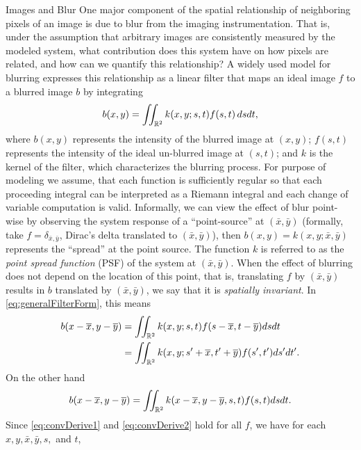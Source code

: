 \begin{chapter}{Images and Blur}
  One major component of the spatial relationship of neighboring pixels of an image is due to blur from the imaging instrumentation.
  That is, under the assumption that arbitrary images are consistently measured by the modeled system, what contribution does this system have on how pixels are related, and how can we quantify this relationship?
  A widely used model for blurring \citep{hansen2010,jain1989,vogel2002,epstein2008} expresses this relationship as a linear filter that maps an ideal image $f$ to a blurred image $b$ by integrating
\begin{equation}\label{eq:generalFilterForm}
  b(x,y) = \iint_{\mathbb R^2} k(x,y;s,t) f(s,t)\,dsdt,
\end{equation}
  where $b(x,y)$ represents the intensity of the blurred image at $(x,y)$; $f(s,t)$ represents the intensity of the ideal un-blurred image at $(s,t)$; and $k$ is the kernel of the filter, which characterizes the blurring process.
  For purpose of modeling we assume, that each function is sufficiently regular so that each proceeding integral can be interpreted as a Riemann integral and each change of variable computation is valid.
  Informally, we can view the effect of blur point-wise by observing the system response of a ``point-source'' at $(\bar x,\bar y)$ (formally, take $f = \delta_{\bar x,\bar y}$, Dirac's delta translated to $(\bar x,\bar y)$), then $b(x,y) = k(x,y;\bar x,\bar y)$ represents the ``spread'' at the point source.
  The function $k$ is referred to as the \emph{point spread function} (PSF) of the system at $(\bar x,\bar y)$.
  When the effect of blurring does not depend on the location of this point, that is, translating $f$ by $(\bar x, \bar y)$ results in $b$ translated by $(\bar x,\bar y)$, we say that it is \emph{spatially invariant}. 
  In \eqref{eq:generalFilterForm}, this means
\begin{align} 
  b(x-\overline x,y-\overline y) 
  &= \iint_{\mathbb R^2} k(x,y;s,t) f(s-\overline x,t - \overline y)dsdt \nonumber\\
  &= \iint_{\mathbb R^2} k(x,y;s'+\overline x,t'+\overline y) f(s',t')ds'dt'.\label{eq:convDerive1}
\end{align}
  On the other hand
\begin{equation} \label{eq:convDerive2}
  b(x-\overline x,y-\overline y) = \iint_{\mathbb R^2} k(x-\overline x,y-\overline y,s,t) f(s,t)dsdt. 
\end{equation}
  Since \eqref{eq:convDerive1} and \eqref{eq:convDerive2} hold for all $f$, we have for each $x,y,\bar x, \bar y,s,$ and $t$,

\end{chapter}
